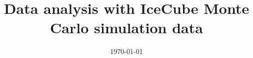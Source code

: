 


\title{Data analysis with IceCube Monte Carlo simulation data}
\date{%
   \today %
}



\maketitle
\thispagestyle{empty}
\tableofcontents
\newpage






\printbibliography{}



